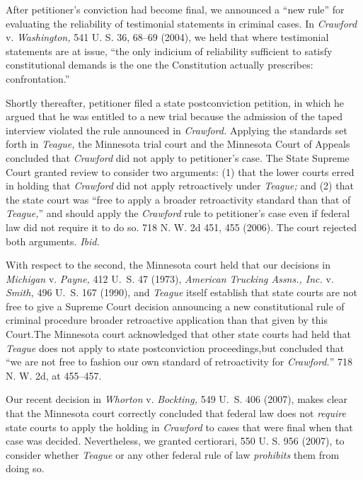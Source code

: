   After petitioner's conviction had become final, we announced a
``new rule'' for evaluating the reliability of testimonial statements
in criminal cases. In \emph{Crawford} v. \emph{Washington,} 541 U. S.
36, 68--69 (2004), we held that where testimonial statements are
at issue, ``the only indicium of reliability sufficient to satisfy
constitutional demands is the one the Constitution actually prescribes:
confrontation.''

  Shortly thereafter, petitioner filed a state postconviction petition,
in which he argued that he was entitled to a new trial because the
admission of the taped interview violated the rule announced in
\emph{Crawford.} Applying the standards set forth in \emph{Teague,} the
Minnesota trial court and the Minnesota Court of Appeals concluded that
\emph{Crawford} did not apply to petitioner's case. The State Supreme
Court granted review to consider two arguments: (1) that the lower
courts erred in holding that \emph{Crawford} did not apply retroactively
under \emph{Teague;} and (2) that the state court was ``free to apply
\newpage  a broader retroactivity standard than that of \emph{Teague,}''
and should apply the \emph{Crawford} rule to petitioner's case even
if federal law did not require it to do so. 718 N. W. 2d 451, 455
(2006). The court rejected both arguments. \emph{Ibid.}

  With respect to the second, the Minnesota court held that our
decisions in \emph{Michigan} v. \emph{Payne,} 412 U.~S. 47 (1973),
\emph{American Trucking Assns., Inc.} v. \emph{Smith,} 496 U.~S. 167
(1990), and \emph{Teague} itself establish that state courts are not free
to give a Supreme Court decision announcing a new constitutional rule
of criminal procedure broader retroactive application than that given
by this Court.\footnotemark[2] The Minnesota court acknowledged that other state
courts had held that \emph{Teague} does not apply to state postconviction
proceedings,\footnotemark[3] but concluded that ``we are not free to fashion our
own standard of retroactivity for \emph{Crawford.}'' 718 N. W. 2d, at
455--457.

  Our recent decision in \emph{Whorton} v. \emph{Bockting,} 549 U.~S. 406
(2007), makes clear that the Minnesota court correctly concluded that
federal law does not \emph{require} state courts to apply the holding
in \emph{Crawford} to cases that were final when that case was decided.
Nevertheless, we granted certiorari, 550 \newpage  U. S. 956 (2007),
to consider whether \emph{Teague} or any other federal rule of law
\emph{prohibits} them from doing so.\footnotemark[4]

